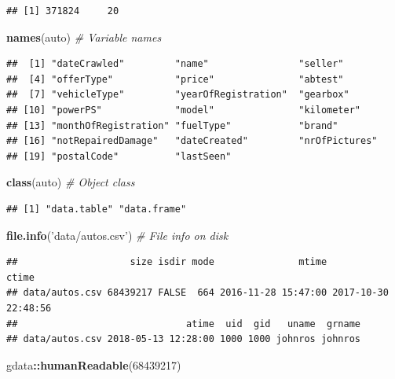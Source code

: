 \documentclass[]{book}
\newenvironment{Shaded}{\begin{snugshade}}{\end{snugshade}}
\newcommand{\KeywordTok}[1]{\textcolor[rgb]{0.13,0.29,0.53}{\textbf{#1}}}
\newcommand{\DecValTok}[1]{\textcolor[rgb]{0.00,0.00,0.81}{#1}}
\newcommand{\StringTok}[1]{\textcolor[rgb]{0.31,0.60,0.02}{#1}}
\newcommand{\CommentTok}[1]{\textcolor[rgb]{0.56,0.35,0.01}{\textit{#1}}}
\newcommand{\OperatorTok}[1]{\textcolor[rgb]{0.81,0.36,0.00}{\textbf{#1}}}
\newcommand{\NormalTok}[1]{#1}
\theoremstyle{definition}
\theoremstyle{definition}
\theoremstyle{definition}
\theoremstyle{remark}
\begin{document}
\begin{verbatim}
## [1] 371824     20
\end{verbatim}

\begin{Shaded}
\begin{Highlighting}[]
\KeywordTok{names}\NormalTok{(auto) }\CommentTok{# Variable names}
\end{Highlighting}
\end{Shaded}

\begin{verbatim}
##  [1] "dateCrawled"         "name"                "seller"             
##  [4] "offerType"           "price"               "abtest"             
##  [7] "vehicleType"         "yearOfRegistration"  "gearbox"            
## [10] "powerPS"             "model"               "kilometer"          
## [13] "monthOfRegistration" "fuelType"            "brand"              
## [16] "notRepairedDamage"   "dateCreated"         "nrOfPictures"       
## [19] "postalCode"          "lastSeen"
\end{verbatim}

\begin{Shaded}
\begin{Highlighting}[]
\KeywordTok{class}\NormalTok{(auto) }\CommentTok{# Object class}
\end{Highlighting}
\end{Shaded}

\begin{verbatim}
## [1] "data.table" "data.frame"
\end{verbatim}

\begin{Shaded}
\begin{Highlighting}[]
\KeywordTok{file.info}\NormalTok{(}\StringTok{'data/autos.csv'}\NormalTok{) }\CommentTok{# File info on disk}
\end{Highlighting}
\end{Shaded}

\begin{verbatim}
##                    size isdir mode               mtime               ctime
## data/autos.csv 68439217 FALSE  664 2016-11-28 15:47:00 2017-10-30 22:48:56
##                              atime  uid  gid   uname  grname
## data/autos.csv 2018-05-13 12:28:00 1000 1000 johnros johnros
\end{verbatim}

\begin{Shaded}
\begin{Highlighting}[]
\NormalTok{gdata}\OperatorTok{::}\KeywordTok{humanReadable}\NormalTok{(}\DecValTok{68439217}\NormalTok{)}
\end{Highlighting}
\end{Shaded}
\end{document}
